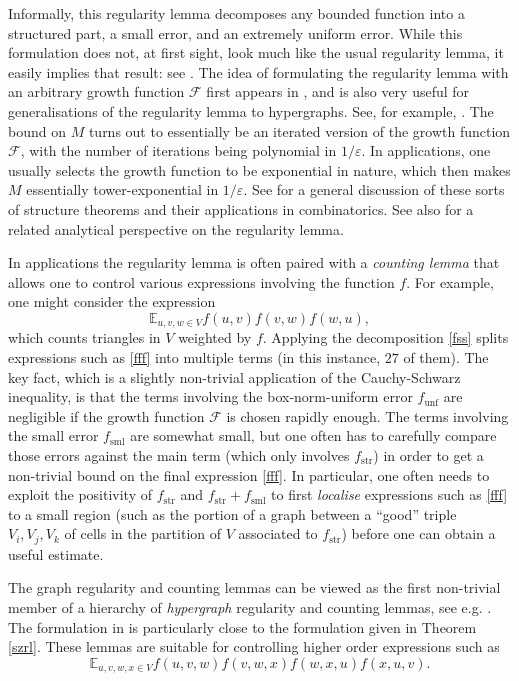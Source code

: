 \documentclass[11pt,reqno]{amsart}
\numberwithin{equation}{section}
\theoremstyle{plain}
\theoremstyle{definition}
\newcommand\E{{\mathbb{E}}}
\newcommand\1{{\bf 1}}
\newcommand\2{{\bf 2}}
\newcommand\eps{\varepsilon}
\newcommand\str{{\operatorname{str}}}
\newcommand\sml{{\operatorname{sml}}}
\newcommand\unf{{\operatorname{unf}}}
\newcommand\Grow{{\mathcal F}}
\begin{document}
Informally, this regularity lemma decomposes any bounded function into a structured part, a small error, and an extremely uniform error.  While this formulation does not, at first sight, look much like the usual regularity lemma, it easily implies that result: see \cite{tao-revisit}.  The idea of formulating the regularity lemma with an arbitrary growth function $\Grow$ first appears in \cite{afks}, and is also very useful for generalisations of the regularity lemma to hypergraphs. See, for example,  \cite{tao-hypergraph}.  The bound on $M$ turns out to essentially be an iterated version of the growth function $\Grow$, with the number of iterations being polynomial in $1/\eps$.  In applications, one usually selects the growth function to be exponential in nature, which then makes $M$ essentially tower-exponential in $1/\eps$.  See \cite{tao-icm,tao-focs} for a general discussion of these sorts of structure theorems and their applications in combinatorics.  See also \cite{lovasz} for a related analytical perspective on the regularity lemma.

In applications the regularity lemma is often paired with a \emph{counting lemma} that allows one to control various expressions involving the function $f$. For example, one might consider the expression
\begin{equation}\label{fff}
\E_{u,v,w \in V} f(u,v) f(v,w) f(w,u),
\end{equation}
which counts triangles in $V$ weighted by $f$.  Applying the decomposition \eqref{fss} splits expressions such as \eqref{fff} into multiple terms (in this instance, $27$ of them).  The key fact, which is a slightly non-trivial application of the Cauchy-Schwarz inequality, is that  the terms involving the box-norm-uniform error $f_\unf$ are negligible if the growth function $\Grow$ is chosen rapidly enough.  The terms involving the small error $f_\sml$ are somewhat small, but one often has to carefully compare those errors against the main term (which only involves $f_\str$) in order to get a non-trivial bound on the final expression \eqref{fff}.  In particular, one often needs to exploit the positivity of $f_\str$ and $f_\str+f_\sml$ to first \emph{localise} expressions such as \eqref{fff} to a small region (such as the portion of a graph between a ``good'' triple $V_i,V_j,V_k$ of cells in the partition of $V$ associated to $f_\str$) before one can obtain a useful estimate.

The graph regularity and counting lemmas can be viewed as the first non-trivial member of a hierarchy of \emph{hypergraph} regularity and counting lemmas, see e.g. \cite{chung,gowers-hypergraph,gowers-hyper-4,nagle-rodl-schacht1,nagle-rodl-schacht,tao-hypergraph}.  The formulation in \cite{tao-hypergraph} is particularly close to the formulation given in Theorem \ref{szrl}.  These lemmas are suitable for controlling higher order expressions such as
$$
\E_{u,v,w,x \in V} f(u,v,w) f(v,w,x) f(w,x,u) f(x,u,v).
$$
\end{document}
